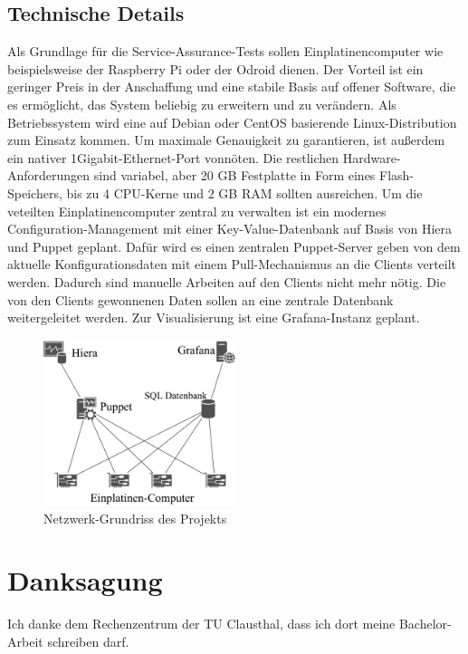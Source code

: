 \documentclass[conference]{IEEEtran}
\begin{document}
\subsection{Technische Details}
Als Grundlage für die Service-Assurance-Tests sollen
Einplatinencomputer wie beispielsweise der Raspberry Pi oder der Odroid
dienen. Der Vorteil ist ein geringer Preis in der Anschaffung und
eine stabile Basis auf offener Software, die es ermöglicht, das System
beliebig zu erweitern und zu verändern. Als Betriebssystem wird eine auf
Debian oder CentOS basierende Linux-Distribution zum Einsatz kommen. Um
maximale Genauigkeit zu garantieren, ist außerdem ein nativer
1Gigabit-Ethernet-Port vonnöten. Die restlichen Hardware-Anforderungen
sind variabel, aber 20 GB Festplatte in Form eines Flash-Speichers, bis
zu 4 CPU-Kerne und 2 GB RAM sollten ausreichen. Um die veteilten
Einplatinencomputer zentral zu verwalten ist ein modernes
Configuration-Management mit einer Key-Value-Datenbank auf Basis von Hiera
und Puppet geplant. Dafür wird es einen zentralen Puppet-Server geben
von dem aktuelle Konfigurationsdaten mit einem Pull-Mechanismus an die
Clients verteilt werden. Dadurch sind manuelle Arbeiten auf den Clients
nicht mehr nötig. Die von den Clients gewonnenen Daten sollen an eine
zentrale Datenbank weitergeleitet werden. Zur Visualisierung ist eine
Grafana-Instanz geplant.
\begin{figure}[h]
    \centering
    \includegraphics[width=0.5\textwidth]{figures/network.pdf}
    \caption{Netzwerk-Grundriss des Projekts}\label{fig:1}
\end{figure}

\section*{Danksagung}
Ich danke dem Rechenzentrum der TU Clausthal, dass ich dort meine
Bachelor-Arbeit schreiben darf.
\end{document}
